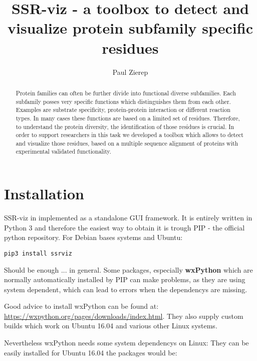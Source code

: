\documentclass[a4paper,10pt]{article}
\title{SSR-viz - a toolbox to detect and visualize protein
subfamily specific residues}
\author{Paul Zierep}
\begin{document}
\maketitle

\begin{abstract}

Protein families can often be further divide into 
functional diverse subfamilies. Each subfamily posses very specific functions
which distinguishes them from each other. Examples are substrate specificity,
protein-protein interaction or different reaction types. In many cases these functions are
based on a limited set of residues. Therefore, to understand the protein diversity,
the identification of those residues is crucial.
In order to support researchers in this task we developed a toolbox
which allows to detect and visualize those residues, based on a multiple sequence 
alignment of proteins with experimental validated functionality.

\end{abstract}

\pagebreak
\tableofcontents
\pagebreak


\section{Installation}


SSR-viz in implemented as a standalone GUI framework. It is entirely 
written in Python 3 and therefore the easiest way to obtain it is trough 
PIP - the official python repository. For Debian bases systems and Ubuntu:

\begin{verbatim}
pip3 install ssrviz
\end{verbatim}

Should be enough ... in general. Some packages, especially \textbf{wxPython} 
which are normally automatically installed
by PIP can make problems, as they are using system dependent, which can 
lead to errors when the dependencys are missing. 

Good advice to install wxPython can be 
found at: \url{https://wxpython.org/pages/downloads/index.html}.
They also supply custom builds which work on Ubuntu 16.04 and various other
Linux systems.

Nevertheless wxPython needs some system dependencys on Linux:
They can be easily installed for Ubuntu 16.04 the packages would be:
\end{document}

